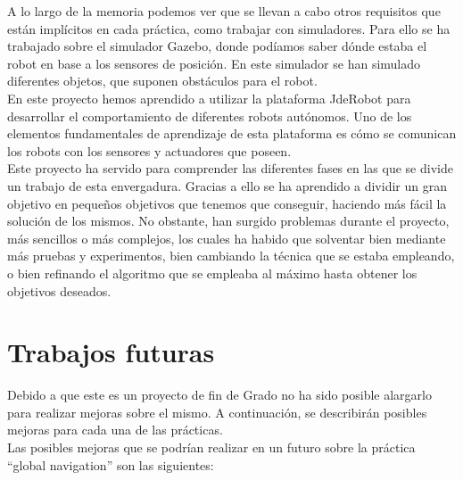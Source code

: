 A lo largo de la memoria podemos ver que se llevan a cabo otros requisitos que están implícitos en cada práctica, como trabajar con simuladores. Para ello se ha trabajado sobre el simulador Gazebo, donde podíamos saber dónde estaba el robot en base a los sensores de posición. En este simulador se han simulado diferentes objetos, que suponen obstáculos para el robot.\\

En este proyecto hemos aprendido a utilizar la plataforma JdeRobot para desarrollar el comportamiento de diferentes robots autónomos. Uno de los elementos fundamentales de aprendizaje de esta plataforma es cómo se comunican los robots con los sensores y actuadores que poseen. \\

Este proyecto ha servido para comprender las diferentes fases en las que se divide un trabajo de esta envergadura. Gracias a ello se ha aprendido a dividir un gran objetivo en pequeños objetivos que tenemos que conseguir, haciendo más fácil la solución de los mismos. No obstante, han surgido problemas durante el proyecto, más sencillos o más complejos, los cuales ha habido que solventar bien mediante más pruebas y experimentos, bien cambiando la técnica que se estaba empleando, o bien refinando el algoritmo que se empleaba al máximo hasta obtener los objetivos deseados.\\

\section{Trabajos futuras}
Debido a que este es un proyecto de fin de Grado no ha sido posible alargarlo para realizar mejoras sobre el mismo. A continuación, se describirán posibles mejoras para cada una de las prácticas.\\

Las posibles mejoras que se podrían realizar en un futuro sobre la práctica ``global navigation'' son las siguientes:

